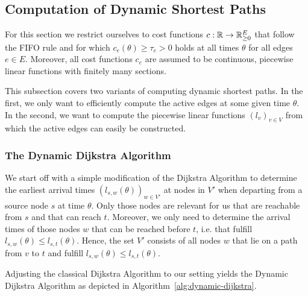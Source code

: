 \subsection{Computation of Dynamic Shortest Paths}

For this section we restrict ourselves to cost functions $c:\mathbb{R}\rightarrow\mathbb{R}_{\geq0}^E$ that follow the FIFO rule and for which $c_e(\theta) \geq \tau_e > 0$ holds at all times $\theta$ for all edges $e\in E$.
Moreover, all cost functions $c_e$ are assumed to be continuous, piecewise linear functions with finitely many sections.

This subsection covers two variants of computing dynamic shortest paths.
In the first, we only want to efficiently compute the active edges at some given time $\theta$.
In the second, we want to compute the piecewise linear functions $(l_v)_{v\in V}$ from which the active edges can easily be constructed.

\subsubsection*{The Dynamic Dijkstra Algorithm}

We start off with a simple modification of the Dijkstra Algorithm to determine the earliest arrival times $(l_{s,w}(\theta))_{w\in V'}$ at nodes in $V'$ when departing from a source node $s$ at time $\theta$.
Only those nodes are relevant for us that are reachable from $s$ and that can reach $t$.
Moreover, we only need to determine the arrival times of those nodes $w$ that can be reached before $t$, i.e. that fulfill $l_{s,w}(\theta) \leq l_{s,t}(\theta)$.
Hence, the set $V'$ consists of all nodes $w$ that lie on a path from $v$ to $t$ and fulfill $l_{s,w}(\theta) \leq l_{s,t}(\theta)$.

Adjusting the classical Dijkstra Algorithm to our setting yields the Dynamic Dijkstra Algorithm as depicted in Algorithm~\ref{alg:dynamic-dijkstra}.


